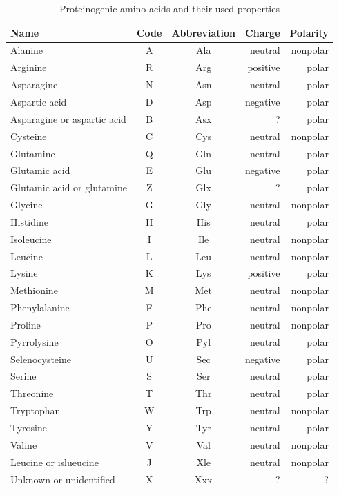 \documentclass[11pt,twoside,a4paper]{book}
\begin{document}
\begin{table}
\begin{center}
 \begin{tabular}{lccrr}
\textbf{Name} & \textbf{Code} & \textbf{Abbreviation} & \textbf{Charge} & \textbf{Polarity} \\
\hline
Alanine & A & Ala & neutral & nonpolar  \\ \hline
Arginine & R & Arg & positive & polar  \\ \hline
Asparagine & N & Asn & neutral & polar \\ \hline 
Aspartic acid & D & Asp & negative & polar  \\ \hline
Asparagine or aspartic acid & B & Asx & ? & polar \\ \hline 
Cysteine & C & Cys & neutral & nonpolar  \\ \hline
Glutamine & Q & Gln & neutral & polar  \\ \hline
Glutamic acid & E & Glu & negative & polar \\ \hline
Glutamic acid or glutamine & Z & Glx & ? & polar \\ \hline
Glycine & G & Gly & neutral & nonpolar \\ \hline
Histidine & H & His & neutral & polar \\ \hline
Isoleucine & I & Ile & neutral & nonpolar \\ \hline
Leucine & L & Leu & neutral & nonpolar \\ \hline
Lysine & K & Lys & positive & polar \\ \hline
Methionine & M & Met & neutral & nonpolar  \\ \hline
Phenylalanine & F & Phe & neutral & nonpolar  \\ \hline
Proline & P & Pro & neutral & nonpolar \\ \hline
Pyrrolysine & O & Pyl  & neutral & polar  \\ \hline
Selenocysteine & U & Sec & negative & polar  \\ \hline
Serine & S & Ser & neutral & polar  \\ \hline
Threonine & T & Thr & neutral & polar \\ \hline
Tryptophan & W & Trp & neutral & nonpolar   \\ \hline
Tyrosine & Y & Tyr & neutral & polar  \\ \hline
Valine & V & Val & neutral & nonpolar \\ \hline
Leucine or islueucine & J & Xle & neutral & nonpolar \\ \hline
Unknown or unidentified & X & Xxx & ? & ? 
\end{tabular}
\caption{Proteinogenic amino acids and their used properties}
\label{tab:aaprops}
\end{center}
\end{table}
\end{document}
